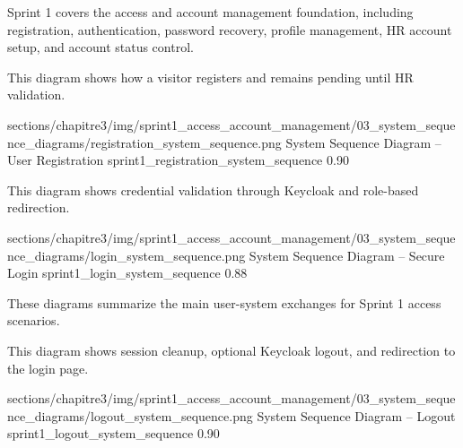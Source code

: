 
{\fontsize{12}{18}\selectfont
\setlength{\parindent}{1.2cm}
\setlength{\parskip}{6pt}

\indent Sprint 1 covers the access and account management foundation, including registration, authentication, password recovery, profile management, HR account setup, and account status control.
}



\Needspace{7.2cm}

\noindent This diagram shows how a visitor registers and remains pending until HR validation.\par

\ChapterThreeFigureSized
{sections/chapitre3/img/sprint1_access_account_management/03_system_sequence_diagrams/registration_system_sequence.png}
{System Sequence Diagram – User Registration}
{sprint1_registration_system_sequence}
{0.90}

\Needspace{9cm}

\noindent This diagram shows credential validation through Keycloak and role-based redirection.\par

\ChapterThreeFigureSized
{sections/chapitre3/img/sprint1_access_account_management/03_system_sequence_diagrams/login_system_sequence.png}
{System Sequence Diagram – Secure Login}
{sprint1_login_system_sequence}
{0.88}

{\fontsize{12}{18}\selectfont
\setlength{\parindent}{1.2cm}
\setlength{\parskip}{6pt}

\indent These diagrams summarize the main user-system exchanges for Sprint 1 access scenarios.
}



\Needspace{7.2cm}

\noindent This diagram shows session cleanup, optional Keycloak logout, and redirection to the login page.\par

\ChapterThreeFigureSized
{sections/chapitre3/img/sprint1_access_account_management/03_system_sequence_diagrams/logout_system_sequence.png}
{System Sequence Diagram – Logout}
{sprint1_logout_system_sequence}
{0.90}

